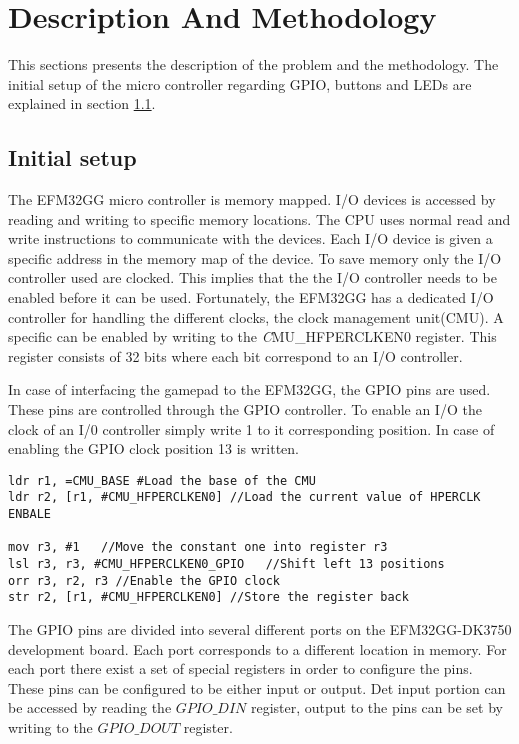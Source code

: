 \section{Description And Methodology}
This sections presents the description of the problem and the methodology. The initial setup of the micro controller regarding GPIO, buttons and LEDs are explained in section \ref{ch:initial_setup}. 


\subsection{Initial setup} \label{ch:initial_setup}
The EFM32GG micro controller is memory mapped. I/O devices is accessed by reading and writing to specific memory locations. The CPU uses normal read and write instructions to communicate with the devices. Each I/O device is given a specific address in the memory map of the device. To save memory only the I/O controller used are clocked. This implies that the the I/O controller needs to be enabled before it can be used. Fortunately, the EFM32GG has a dedicated I/O controller for handling the different clocks, the clock management unit(CMU). A specific can be enabled by writing to the \emph CMU\_HFPERCLKEN0 register. This register consists of 32 bits where each bit correspond to an I/O controller. 

In case of interfacing the gamepad to the EFM32GG, the GPIO pins are used. These pins are controlled through the GPIO controller. To enable an I/O the clock of an I/0 controller simply write 1 to it corresponding position. In case of enabling the GPIO clock position 13 is written. 

\begin{lstlisting}
ldr r1, =CMU_BASE #Load the base of the CMU
ldr r2, [r1, #CMU_HFPERCLKEN0] //Load the current value of HPERCLK ENBALE

mov r3, #1   //Move the constant one into register r3
lsl r3, r3, #CMU_HFPERCLKEN0_GPIO   //Shift left 13 positions
orr r3, r2, r3 //Enable the GPIO clock
str r2, [r1, #CMU_HFPERCLKEN0] //Store the register back 
\end{lstlisting}


The GPIO pins are divided into several different ports on the EFM32GG-DK3750 development board. Each port corresponds to a different location in memory. For each port there exist a set of special registers in order to configure the pins. These pins can be configured to be either input or output. Det input portion can be accessed by reading the $GPIO\_DIN$ register, output to the pins can be set by writing to the $GPIO\_DOUT$ register. 

